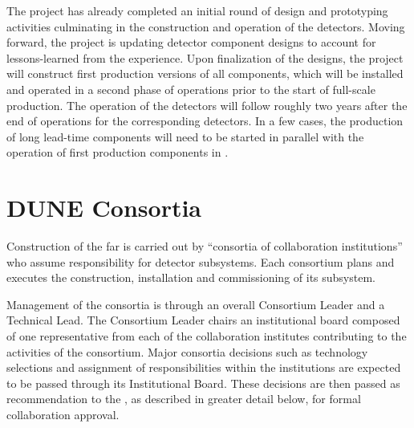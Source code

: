 The  project has already completed an initial round of design 
and prototyping activities culminating in the construction and operation 
of the  detectors.  Moving forward, the project is 
updating detector component designs to account for lessons-learned from 
the  experience.  Upon finalization of the designs, the 
project will construct first production versions of all components, which 
will be installed and operated in a second phase of  
operations prior to the start of full-scale production.  The operation 
of the  detectors will follow roughly two years after
the end of operations for the corresponding  detectors.
In a few cases, the production of long lead-time components will need to 
be started in parallel with the operation of first production components 
in .

\section{DUNE Consortia}
\label{sec:consortia}

Construction of the  far  is carried out by 
``consortia of collaboration institutions'' who assume responsibility for 
detector subsystems.  Each consortium plans and executes the construction, 
installation and commissioning of its subsystem.

Management of the consortia is through an overall Consortium Leader and 
a Technical Lead.  The Consortium Leader chairs an institutional board 
composed of one representative from each of the collaboration institutes 
contributing to the activities of the consortium.  Major consortia decisions 
such as technology selections and assignment of responsibilities within 
the institutions are expected to be passed through its Institutional Board.  
These decisions are then passed as recommendation to the  
, as described in greater detail below, for formal collaboration 
approval.

